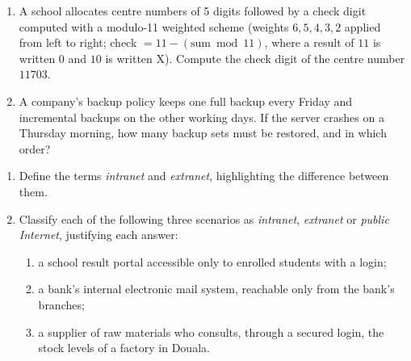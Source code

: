 \documentclass[11pt]{article}
\newcounter{popsec}
\newcounter{popsub}
\newcommand{\courssub}[1]{%
  \stepcounter{popsub}%
  \par\vspace{9pt}\noindent{\popxbold\fontsize{11.5}{13}\selectfont\color{popink}{\color{poporange}\thepopsec.\thepopsub}\hspace{6pt}#1}\par\nopagebreak\vspace{4pt}
}
\begin{document}
\begin{exercice}
\begin{enumerate}
\item A school allocates centre numbers of 5 digits followed by a check digit computed with a modulo-11 weighted scheme (weights $6,5,4,3,2$ applied from left to right; check $= 11 - (\text{sum} \bmod 11)$, where a result of $11$ is written $0$ and $10$ is written X). Compute the check digit of the centre number $11703$.
\item A company's backup policy keeps one full backup every Friday and incremental backups on the other working days. If the server crashes on a Thursday morning, how many backup sets must be restored, and in which order?
\end{enumerate}
\end{exercice}

\courssub{I practise}

\begin{exercice}
\begin{enumerate}
\item Define the terms \emph{intranet} and \emph{extranet}, highlighting the difference between them.
\item Classify each of the following three scenarios as \emph{intranet}, \emph{extranet} or \emph{public Internet}, justifying each answer:
\begin{enumerate}
\item a school result portal accessible only to enrolled students with a login;
\item a bank's internal electronic mail system, reachable only from the bank's branches;
\item a supplier of raw materials who consults, through a secured login, the stock levels of a factory in Douala.
\end{enumerate}
\end{enumerate}
\end{exercice}
\end{document}
